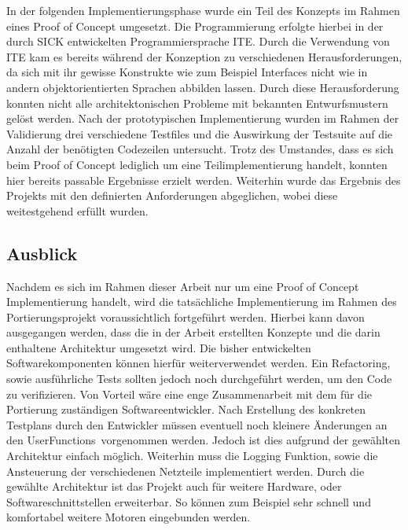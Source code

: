 In der folgenden Implementierungsphase wurde ein Teil des Konzepts im Rahmen eines Proof of Concept umgesetzt. Die Programmierung erfolgte hierbei in der durch SICK entwickelten Programmiersprache ITE. Durch die Verwendung von ITE kam es bereits während der Konzeption zu verschiedenen Herausforderungen, da sich mit ihr gewisse Konstrukte wie zum Beispiel Interfaces nicht wie in andern objektorientierten Sprachen abbilden lassen. Durch diese Herausforderung konnten nicht alle architektonischen Probleme mit bekannten Entwurfsmustern gelöst werden.
Nach der prototypischen Implementierung wurden im Rahmen der Validierung drei verschiedene Testfiles  und die Auswirkung der Testsuite auf die Anzahl der benötigten Codezeilen untersucht. Trotz des Umstandes, dass es sich beim Proof of Concept lediglich um eine Teilimplementierung handelt, konnten hier bereits passable Ergebnisse erzielt werden. Weiterhin wurde das Ergebnis des Projekts mit den definierten Anforderungen abgeglichen, wobei diese weitestgehend erfüllt wurden.
\subsection{Ausblick}
Nachdem es sich im Rahmen dieser Arbeit nur um eine Proof of Concept Implementierung handelt, wird die tatsächliche Implementierung im Rahmen des Portierungsprojekt voraussichtlich fortgeführt werden. Hierbei kann davon ausgegangen werden, dass die in der Arbeit erstellten Konzepte und die darin enthaltene Architektur umgesetzt wird. Die bisher entwickelten Softwarekomponenten können hierfür weiterverwendet werden. Ein Refactoring, sowie ausführliche Tests sollten jedoch noch durchgeführt werden, um den Code zu verifizieren. Von Vorteil wäre eine enge Zusammenarbeit mit dem für die Portierung zuständigen Softwareentwickler. Nach Erstellung des konkreten Testplans durch den Entwickler müssen eventuell noch kleinere Änderungen an den \dq UserFunctions\dq~vorgenommen werden. Jedoch ist dies aufgrund der gewählten Architektur einfach möglich. Weiterhin muss die Logging Funktion, sowie die Ansteuerung der verschiedenen Netzteile implementiert werden. Durch die gewählte Architektur ist das Projekt auch für weitere Hardware, oder Softwareschnittstellen erweiterbar. So können zum Beispiel sehr schnell und komfortabel weitere Motoren eingebunden werden.  